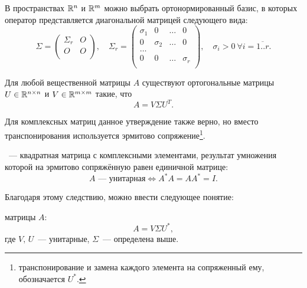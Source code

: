 \begin{theorem}
    В пространствах $\mathbb{R}^n$ и $\mathbb{R}^m$ можно выбрать ортонормированный базис, в которых оператор представляется диагональной
    матрицей следующего вида:
    \[
        \Sigma = \left(
        \begin{array}{c|c}
                \Sigma_r & O \\
                \hline
                O        & O \\
            \end{array}
        \right),\quad
        \Sigma_r=
        \left(
        \begin{array}{cccc}
                \sigma_1 & 0        & \ldots & 0        \\
                0        & \sigma_2 & \ldots & 0        \\
                \ldots                                  \\
                0        & 0        & \ldots & \sigma_r \\
            \end{array}
        \right), \quad \sigma_i>0\ \forall i=\overline{1..r}.
    \]
\end{theorem}

\begin{next0}
    Для любой вещественной матрицы $A$ существуют ортогональные матрицы $U\in\mathbb{R}^{n\times n}$ и $V\in\mathbb{R}^{m\times m}$
    такие, что
    \[
        A=V\Sigma U^T.
    \]
\end{next0}

\begin{remark}
    Для комплексных матриц данное утверждение также верно, но вместо транспонирования используется эрмитово
    сопряжение\footnote{транспонирование и замена каждого элемента на сопряженный ему, обозначается $U^*$.}.
\end{remark}

\begin{definition}
    ~--- квадратная матрица с комплексными элементами,
    результат умножения которой на эрмитово сопряжённую равен единичной матрице:
    \[
        A\text{~--- унитарная} \Longleftrightarrow A^*A=AA^*=I.
    \]
\end{definition}

Благодаря этому следствию, можно ввести следующее понятие:

\begin{definition}
     матрицы $A$:
    \[
        A=V\Sigma U^*,
    \] где $V,\, U$~--- унитарные, $\Sigma$~--- определена выше.
\end{definition}

